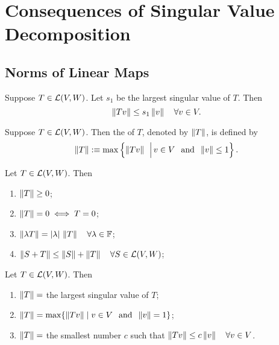 \section{Consequences of Singular Value Decomposition}

\subsection{Norms of Linear Maps}

\begin{thm}
  Suppose $T \in \mathcal{L} (V,W)$. Let $s_1$ be the largest singular value of $T$. Then
  \[
    \left \lVert Tv \right \rVert \leq s_1 \left \lVert v \right \rVert \quad \forall v \in V.
  \]
\end{thm}

\begin{mydef}
  Suppose $T \in \mathcal{L} (V,W)$. Then the  of $T$, denoted by $\left \lVert T \right \rVert$, is defined by
  \[
    \left \lVert T \right \rVert :\equiv \max \left \{ \left \lVert Tv \right \rVert \; \,\Big\vert\, v \in V \;\;\, \text{and}\;\; \left \lVert v \right \rVert \leq 1 \right \}.
  \]
\end{mydef}

\begin{thm}
  \label{thm: basic properties of norms of linear maps}
  Let $T\in \mathcal{L}(V,W)$. Then
  \begin{enumerate}[label=\textbf{(\alph*)}]
    \item $\left \lVert T \right \rVert \geq 0$;
    \item $\left \lVert T \right \rVert = 0 \iff T = 0$;
    \item $\left \lVert \lambda T \right \rVert = |\lambda| \, \left \lVert T \right \rVert  \quad \forall \lambda \in \mathbb{F}$;
    \item $\left \lVert S+T \right \rVert \leq \left \lVert S \right \rVert + \left \lVert T \right \rVert \quad \forall S \in \mathcal{L}(V,W)$;
  \end{enumerate}
\end{thm}

\begin{thm}
  \label{thm: alternative formulas for ||T||}
  Let $T \in \mathcal{L} (V,W)$. Then
  \begin{enumerate}[label=\textbf{(\alph*)}]
    \item $\left \lVert T \right \rVert =$ the largest singular value of $T$;
    \item $\left \lVert T \right \rVert = \max\{\left \lVert Tv \right \rVert \mid v \in V \;\;\, \text{and}\;\; \left \lVert v \right \rVert = 1 \}$;
    \item $\left \lVert T \right \rVert =$ the smallest number $c$ such that
    $\left \lVert Tv \right \rVert \leq c \left \lVert v \right \rVert \quad \forall v \in V$.
  \end{enumerate}
\end{thm}

